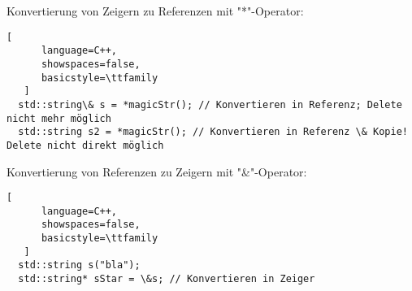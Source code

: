 \documentclass[10pt]{article}
\begin{document}
\begin{itemize*}
  
  \item Konvertierung von Zeigern zu Referenzen mit "*"-Operator:
  \begin{lstlisting}[
      language=C++,
      showspaces=false,
      basicstyle=\ttfamily
   ]
  std::string\& s = *magicStr(); // Konvertieren in Referenz; Delete nicht mehr möglich
  std::string s2 = *magicStr(); // Konvertieren in Referenz \& Kopie! Delete nicht direkt möglich
\end{lstlisting}
  
  \item Konvertierung von Referenzen zu Zeigern mit "\&"-Operator:
  \begin{lstlisting}[
      language=C++,
      showspaces=false,
      basicstyle=\ttfamily
   ]
  std::string s("bla");
  std::string* sStar = \&s; // Konvertieren in Zeiger
\end{lstlisting}
\end{itemize*}
\end{document}
